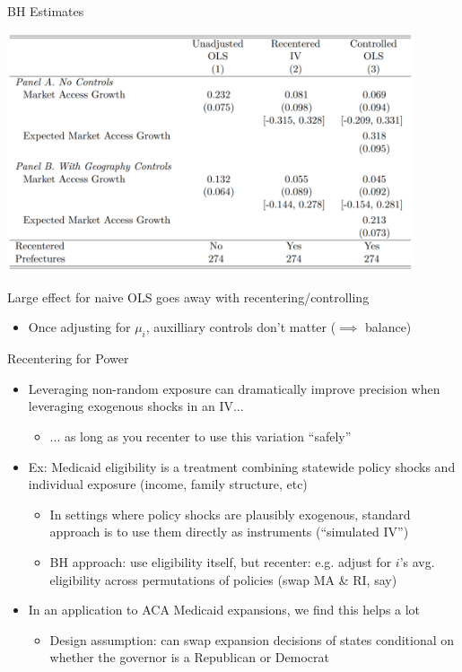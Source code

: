 \documentclass[11pt,english]{beamer}
\begin{document}
\begin{frame}{BH Estimates}

\begin{center}
	\includegraphics[width=0.9\textwidth]{figures/hsr_tab.png}
\end{center}

Large effect for naive OLS goes away with recentering/controlling \smallskip
\begin{itemize}
\item Once adjusting for $\mu_i$, auxilliary controls don't matter ($\implies$ balance)
\end{itemize}

\end{frame}

\begin{frame}{Recentering for Power}

\begin{itemize}
\item Leveraging non-random exposure can dramatically improve precision when leveraging exogenous shocks in an IV...
\begin{itemize}
\item ... as long as you recenter to use this variation ``safely''
\end{itemize}\medskip\pause{}

\item Ex: Medicaid eligibility is a treatment combining statewide policy shocks and individual exposure (income, family structure, etc)
\begin{itemize}
\item In settings where policy shocks are plausibly exogenous, standard approach is to use them directly as instruments (``simulated IV'')
\item BH approach: use eligibility itself, but recenter: e.g. adjust for $i$'s avg. eligibility across permutations of policies (swap MA \& RI, say)
\end{itemize}\bigskip\pause{}
\item In an application to ACA Medicaid expansions, we find this helps a lot\smallskip
\begin{itemize}
\item Design assumption: can swap expansion decisions of states conditional on whether the governor is a Republican or Democrat
\end{itemize}
\end{itemize}
\end{frame}
\end{document}
